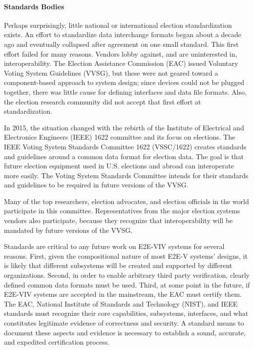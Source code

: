 \paragraph{Standards Bodies} 
Perhaps surprisingly, little national or international election
standardization exists. An effort to standardize data interchange
formats began about a decade ago and eventually collapsed after
agreement on one small standard. This first effort failed for many
reasons. Vendors lobby against, and are uninterested in,
interoperability. The Election Assistance Commission (EAC) issued
Voluntary Voting System Guidelines (VVSG), but these were not geared
toward a component-based approach to system design; since devices
could not be plugged together, there was little cause for defining
interfaces and data file formats. Also, the election research
community did not accept that first effort at standardization.

In 2015, the situation changed with the rebirth of the Institute of
Electrical and Electronics Engineers (IEEE) 1622 committee and its
focus on elections. The IEEE Voting System Standards Committee 1622
(VSSC/1622) creates standards and guidelines around a common data
format for election data. The goal is that future election equipment
used in U.S. elections and abroad can interoperate more easily. The
Voting System Standards Committee intends for their standards and
guidelines to be required in future versions of the VVSG.

Many of the top researchers, election advocates, and election
officials in the world participate in this committee. Representatives
from the major election systems vendors also participate, because they
recognize that interoperability will be mandated by future versions of
the VVSG.

Standards are critical to any future work on E2E-VIV systems for
several reasons. First, given the compositional nature of most E2E-V
systems’ designs, it is likely that different subsystems will be
created and supported by different organizations. Second, in order to
enable arbitrary third party verification, clearly defined common data
formats must be used. Third, at some point in the future, if E2E-VIV
systems are accepted in the mainstream, the EAC must certify them. The
EAC, National Institute of Standards and Technology (NIST), and IEEE
standards must recognize their core capabilities, subsystems,
interfaces, and what constitutes legitimate evidence of correctness
and security. A standard means to document these aspects and evidence
is necessary to establish a sound, accurate, and expedited
certification process.


